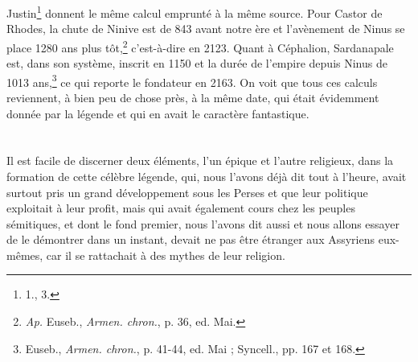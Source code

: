 \documentclass[a4paper, 11pt, oneside]{article}
\begin{document}
Justin\footnote{1., 3.} donnent le même calcul emprunté à la même source. Pour Castor de Rhodes, la chute de Ninive est de 843 avant notre ère et l'avènement de Ninus se place 1280 ans plus tôt,\footnote{\emph{Ap.} Euseb., \emph{Armen. chron.}, p. 36, ed. Mai.} c'est-à-dire en 2123. Quant à Céphalion, Sardanapale est, dans son système, inscrit en 1150 et la durée de l'empire depuis Ninus de 1013 ans,\footnote{Euseb., \emph{Armen. chron.}, p. 41-44, ed. Mai ; Syncell., pp. 167 et 168.} ce qui reporte le fondateur en 2163. On voit que tous ces calculs reviennent, à bien peu de chose près, à la même date, qui était évidemment donnée par la légende et qui en avait le caractère fantastique.

\bigskip \centerline{\EightStarTaper} \centerline{\EightStarTaper\EightStarTaper} \bigskip\clearpage
\section{}
\paragraph{}
Il est facile de discerner deux éléments, l'un épique et l'autre religieux, dans la formation de cette célèbre légende, qui, nous l'avons déjà dit tout à l'heure, avait surtout pris un grand développement sous les Perses et que leur politique exploitait à leur profit, mais qui avait également cours chez les peuples sémitiques, et dont le fond premier, nous l'avons dit aussi et nous allons essayer de le démontrer dans un instant, devait ne pas être étranger aux Assyriens eux-mêmes, car il se rattachait à des mythes de leur religion.
\end{document}
